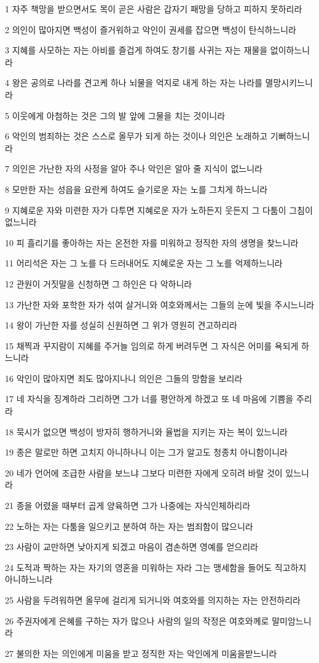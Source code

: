 \par 1 자주 책망을 받으면서도 목이 곧은 사람은 갑자기 패망을 당하고 피하지 못하리라
\par 2 의인이 많아지면 백성이 즐거워하고 악인이 권세를 잡으면 백성이 탄식하느니라
\par 3 지혜를 사모하는 자는 아비를 즐겁게 하여도 창기를 사귀는 자는 재물을 없이하느니라
\par 4 왕은 공의로 나라를 견고케 하나 뇌물을 억지로 내게 하는 자는 나라를 멸망시키느니라
\par 5 이웃에게 아첨하는 것은 그의 발 앞에 그물을 치는 것이니라
\par 6 악인의 범죄하는 것은 스스로 올무가 되게 하는 것이나 의인은 노래하고 기뻐하느니라
\par 7 의인은 가난한 자의 사정을 알아 주나 악인은 알아 줄 지식이 없느니라
\par 8 모만한 자는 성읍을 요란케 하여도 슬기로운 자는 노를 그치게 하느니라
\par 9 지혜로운 자와 미련한 자가 다투면 지혜로운 자가 노하든지 웃든지 그 다툼이 그침이 없느니라
\par 10 피 흘리기를 좋아하는 자는 온전한 자를 미워하고 정직한 자의 생명을 찾느니라
\par 11 어리석은 자는 그 노를 다 드러내어도 지혜로운 자는 그 노를 억제하느니라
\par 12 관원이 거짓말을 신청하면 그 하인은 다 악하니라
\par 13 가난한 자와 포학한 자가 섞여 살거니와 여호와께서는 그들의 눈에 빛을 주시느니라
\par 14 왕이 가난한 자를 성실히 신원하면 그 위가 영원히 견고하리라
\par 15 채찍과 꾸지람이 지혜를 주거늘 임의로 하게 버려두면 그 자식은 어미를 욕되게 하느니라
\par 16 악인이 많아지면 죄도 많아지나니 의인은 그들의 망함을 보리라
\par 17 네 자식을 징계하라 그리하면 그가 너를 평안하게 하겠고 또 네 마음에 기쁨을 주리라
\par 18 묵시가 없으면 백성이 방자히 행하거니와 율법을 지키는 자는 복이 있느니라
\par 19 종은 말로만 하면 고치지 아니하나니 이는 그가 알고도 청종치 아니함이니라
\par 20 네가 언어에 조급한 사람을 보느냐 그보다 미련한 자에게 오히려 바랄 것이 있느니라
\par 21 종을 어렸을 때부터 곱게 양육하면 그가 나중에는 자식인체하리라
\par 22 노하는 자는 다툼을 일으키고 분하여 하는 자는 범죄함이 많으니라
\par 23 사람이 교만하면 낮아지게 되겠고 마음이 겸손하면 영예를 얻으리라
\par 24 도적과 짝하는 자는 자기의 영혼을 미워하는 자라 그는 맹세함을 들어도 직고하지 아니하느니라
\par 25 사람을 두려워하면 올무에 걸리게 되거니와 여호와를 의지하는 자는 안전하리라
\par 26 주권자에게 은혜를 구하는 자가 많으나 사람의 일의 작정은 여호와께로 말미암느니라
\par 27 불의한 자는 의인에게 미움을 받고 정직한 자는 악인에게 미움을받느니라

